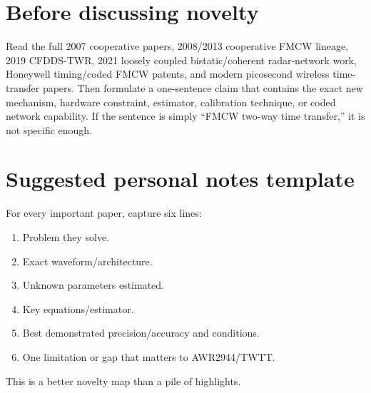 \documentclass[11pt]{article}
\begin{document}
\section{Before discussing novelty}
Read the full 2007 cooperative papers, 2008/2013 cooperative FMCW lineage, 2019 CFDDS-TWR, 2021 loosely coupled bistatic/coherent radar-network work, Honeywell timing/coded FMCW patents, and modern picosecond wireless time-transfer papers. Then formulate a one-sentence claim that contains the exact new mechanism, hardware constraint, estimator, calibration technique, or coded network capability. If the sentence is simply ``FMCW two-way time transfer,'' it is not specific enough.

\section{Suggested personal notes template}
For every important paper, capture six lines:
\begin{enumerate}
\item Problem they solve.
\item Exact waveform/architecture.
\item Unknown parameters estimated.
\item Key equations/estimator.
\item Best demonstrated precision/accuracy and conditions.
\item One limitation or gap that matters to AWR2944/TWTT.
\end{enumerate}
This is a better novelty map than a pile of highlights.
\end{document}
